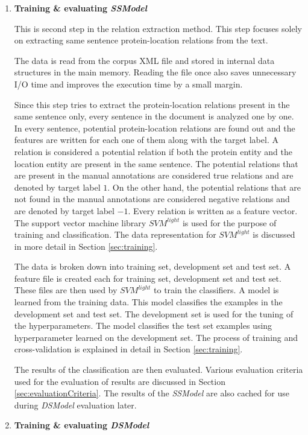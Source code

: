 \begin{enumerate}
\item \textbf{Training \& evaluating \textit{SSModel}}

This is second step in the relation extraction method. This step focuses solely on extracting same sentence protein-location relations from the text. 

The data is read from the corpus XML file and stored in internal data structures in the main memory. Reading the file once also saves unnecessary I/O time and improves the execution time by a small margin. 

Since this step tries to extract the protein-location relations present in the same sentence only, every sentence in the document is analyzed one by one. In every sentence, potential protein-location relations are found out and the features are written for each one of them along with the target label. A relation is considered a potential relation if both the protein entity and the location entity are present in the same sentence. The potential relations that are present in the manual annotations are considered true relations and are denoted by target label $1$. On the other hand, the potential relations that are not found in the manual annotations are considered negative relations and are denoted by target label $-1$. Every relation is written as a feature vector. The support vector machine library $SVM^{light}$ \cite{joachims1999making} is used for the purpose of training and classification.  The data representation for $SVM^{light}$ is discussed in more detail in Section \ref{sec:training}.

The data is broken down into training set, development set and test set. A feature file is created each for training set, development set and test set. These files are then used by $SVM^{light}$ to train the classifiers. A model is learned from the training data. This model classifies the examples in the development set and test set. The development set is used for the tuning of the hyperparameters. The model classifies the test set examples using hyperparameter learned on the development set. The process of training and cross-validation is explained in detail in Section \ref{sec:training}. 

The results of the classification are then evaluated. Various evaluation criteria used for the evaluation of results are discussed in Section \ref{sec:evaluationCriteria}. The results of the \textit{SSModel} are also cached for use during \textit{DSModel} evaluation later.

\item \textbf{Training \& evaluating \textit{DSModel}}


\end{enumerate}
